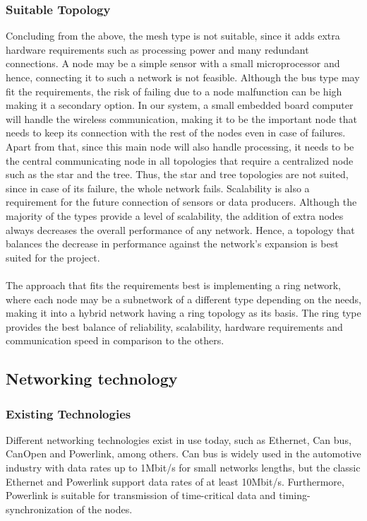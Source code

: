 \subsubsection{Suitable Topology}
Concluding from the above, the mesh type is not suitable, since it adds extra hardware requirements such as processing power and many redundant connections. A node may be a simple sensor with a small microprocessor and hence, connecting it to such a network is not feasible. Although the bus type may fit the requirements, the risk of failing due to a node malfunction can be high making it a secondary option. In our system, a small embedded board computer will handle the wireless communication, making it to be the important node that needs to keep its connection with the rest of the nodes even in case of failures. Apart from that, since this main node will also handle processing, it needs to be the central communicating node in all topologies that require a centralized node such as the star and the tree. Thus, the star and tree topologies are not suited, since in case of its failure, the whole network fails. Scalability is also a requirement for the future connection of sensors or data producers. Although the majority of the types provide a level of scalability, the addition of extra nodes always decreases the overall performance of any network. Hence, a topology that balances the decrease in performance against the network's expansion is best suited for the project.\\\\
The approach that fits the requirements best is implementing a ring network, where each node may be a subnetwork of a different type depending on the needs, making it into a hybrid network having a ring topology as its basis. The ring type provides the best balance of reliability, scalability, hardware requirements and communication speed in comparison to the others.

\subsection{Networking technology}

\subsubsection{Existing Technologies}
Different networking technologies exist in use today, such as Ethernet, Can bus, CanOpen and Powerlink, among others. Can bus is widely used in the automotive industry with data rates up to 1Mbit/s for small networks lengths, but the classic Ethernet and Powerlink support data rates of at least 10Mbit/s. Furthermore, Powerlink is suitable for transmission of time-critical data and timing-synchronization of the nodes. 
